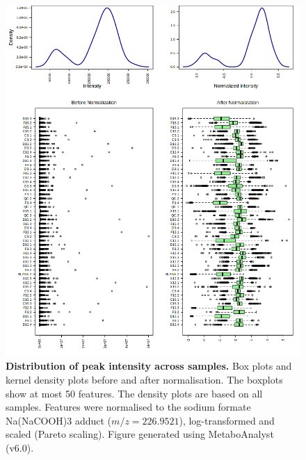 \begin{figure}[htp!]
    \centering
    \includegraphics[width=\textwidth]{Figures/snorm_0_dpi72.png}
    \caption[Distribution of peak intensity across samples.]{\textbf{Distribution of peak intensity across samples.} Box plots and kernel density plots before and after normalisation. The boxplots show at most 50 features. The density plots are based on all samples. Features were normalised to the sodium formate Na(NaCOOH)3 adduct ($m/z=226.9521$), log-transformed and scaled (Pareto scaling). Figure generated using MetaboAnalyst (v6.0).}
    \label{fig:AllSamplesNormDis}
\end{figure}